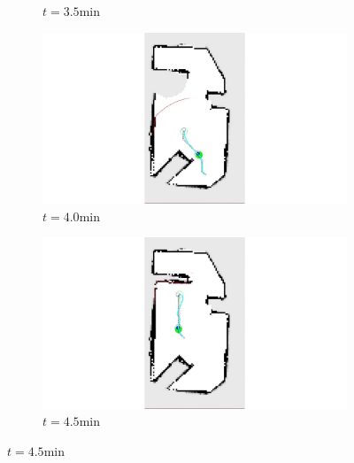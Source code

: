 \documentclass[11pt,professionalfonts,hyperref={pdftex,pdfpagemode=none,pdfstartview=FitH}]{beamer}
\begin{document}
\begin{frame}
\begin{figure}
{\begin{subfigure}[b]{0.19\textwidth}
        		\caption*{$t=3.5$min}
        		\label{fig:Experiment_ogm_t3p5}
    	\end{subfigure}
	\begin{subfigure}[b]{0.19\textwidth}
        		\includegraphics[trim={13cm 1cm 13cm 0}, clip, width=\textwidth]{t_4min.jpg}
        		\caption*{$t=4.0$min}
        		\label{fig:Experiment_ogm_t4}
    	\end{subfigure}
	\begin{subfigure}[b]{0.19\textwidth}
        		\includegraphics[trim={13cm 1cm 13cm 0}, clip, width=\textwidth]{t_4p5min.jpg}
        		\caption*{$t=4.5$min}
        		\label{fig:Experiment_ogm_t4p5}
    	\end{subfigure}
	}
\end{figure}

\end{frame}



\section*{}
\end{document}
